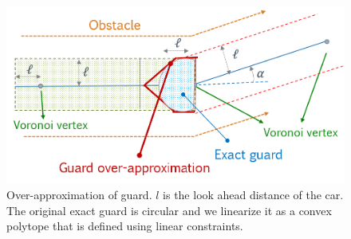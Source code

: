 


\begin{figure}
\centering
\includegraphics[width=0.8\linewidth]{Figures/rss2021-guard-approximate.png}
\caption{Over-approximation of guard.  $l$ is the look ahead distance of the car. The original exact guard is circular and we linearize it as a convex polytope that is defined using linear constraints.}
\label{fig:guard_inv_approx}
\end{figure}



